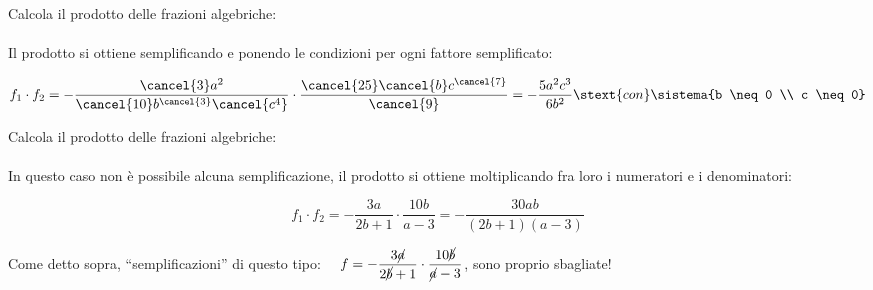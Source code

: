 
\begin{esempio}{}{}
Calcola il prodotto delle frazioni algebriche:\\
\\ [-.5em]

Il prodotto si ottiene semplificando e ponendo le condizioni per ogni fattore 
semplificato: 

\vspace{-1em}
\[f_1 \cdot f_2 =
-\dfrac{\cancel{3}a^{2}}{\cancel{10}b^{\cancel{3}}\cancel{c^{4}}}
\cdot \dfrac{\cancel{25}\cancel{b}c^{\cancel{7}}}{\cancel{9}}=
-{\dfrac{5a^{2}c^{3}}{6b^{2}}} 
\stext{ con } \sistema{b \neq 0 \\ c \neq 0}\]
\end{esempio}

\begin{esempio}{}{}
Calcola il prodotto delle frazioni algebriche:\\
\\ [-.5em]

In questo caso non è possibile alcuna semplificazione, il prodotto si ottiene 
moltiplicando fra loro i numeratori e i denominatori:

\vspace{-.5em}
\[f_1 \cdot f_2 = 
-{\dfrac{3a}{2b+1}}\cdot\dfrac{10b}{a-3}=
-{\dfrac{30ab}{(2b+1)(a-3)}}\] 
\begin{osservazione}{}{}
Come detto sopra, ``semplificazioni'' di questo tipo:~~
\(f=-{\dfrac{3\cancel{a}}{2\cancel{b}+1}}\cdot
    \dfrac{10\cancel{b}}{\cancel{a}-3}\), 
sono proprio sbagliate!
\end{osservazione}


\end{esempio}

